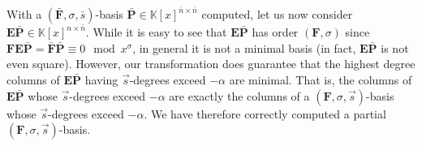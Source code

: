 With a $\left(\bar{\mathbf{F}},\sigma,\bar{s}\right)$-basis $\bar{\mathbf{P}}\in\mathbb{K}\left[x\right]^{\bar{n}\times\bar{n}}$
computed, let us now consider $\mathbf{E}\bar{\mathbf{P}}\in\mathbb{K}\left[x\right]^{n\times\bar{n}}$.
While it is easy to see that $\mathbf{E}\bar{\mathbf{P}}$ has order
$\left(\mathbf{F},\sigma\right)$ since \textbf{$\mathbf{F}\mathbf{E}\bar{\mathbf{P}}=\bar{\mathbf{F}}\bar{\mathbf{P}}\equiv0\mod x^{\sigma}$},
in general it is not a minimal basis (in fact, $\mathbf{E}\bar{\mathbf{P}}$
is not even square). However, our transformation does guarantee that
the highest degree columns of $\mathbf{E}\bar{\mathbf{P}}$ having
$\vec{s}$-degrees exceed $-\alpha$ are minimal. That is, the columns
of $\mathbf{E}\bar{\mathbf{P}}$ whose $\vec{s}$-degrees exceed $-\alpha$
are exactly the columns of a $\left(\mathbf{F},\sigma,\vec{s}\right)$-basis
whose $\vec{s}$-degrees exceed $-\alpha$. We have therefore correctly
computed a partial $\left(\mathbf{F},\sigma,\vec{s}\right)$-basis. 
